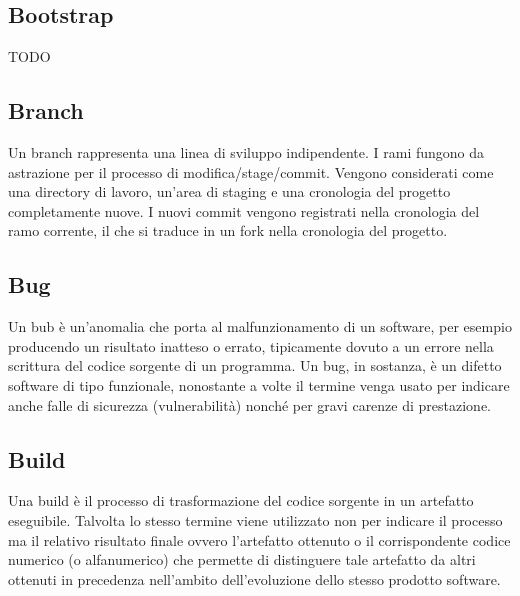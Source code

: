 \vspace{2em}
\subsection*{Bootstrap}
TODO

\vspace{2em}
\subsection*{Branch}
Un branch rappresenta una linea di sviluppo indipendente. I rami fungono da astrazione per il processo di modifica/stage/commit. Vengono considerati come una directory di lavoro, un'area di staging e una cronologia del progetto completamente nuove. I nuovi commit vengono registrati nella cronologia del ramo corrente, il che si traduce in un fork nella cronologia del progetto.

\vspace{2em}
\subsection*{Bug}
Un bub è un'anomalia che porta al malfunzionamento di un software, per esempio producendo un risultato inatteso o errato, tipicamente dovuto a un errore nella scrittura del codice sorgente di un programma. Un bug, in sostanza, è un difetto software di tipo funzionale, nonostante a volte il termine venga usato per indicare anche falle di sicurezza (vulnerabilità) nonché per gravi carenze di prestazione.

\vspace{2em}
\subsection*{Build}
Una build è il processo di trasformazione del codice sorgente in un artefatto eseguibile. Talvolta lo stesso termine viene utilizzato non per indicare il processo ma il relativo risultato finale ovvero l'artefatto ottenuto o il corrispondente codice numerico (o alfanumerico) che permette di distinguere tale artefatto da altri ottenuti in precedenza nell'ambito dell'evoluzione dello stesso prodotto software.
